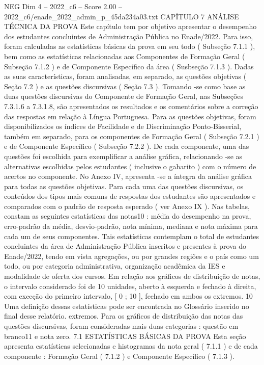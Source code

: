 \begin{textsample}{NEG Dim 4 – 2022\_c6 – Score 2.00 – 2022\_c6/enade\_2022\_admin\_p\_45da234a03.txt}  \label{ex:f4_neg_275}
CAPÍTULO 7 ANÁLISE TÉCNICA DA PROVA Este capítulo tem por objetivo apresentar o desempenho dos estudantes concluintes de Administração Pública no Enade/2022.
Para isso, foram calculadas as estatísticas básicas da prova em seu todo ( Subseção 7.1.1 ), bem como as estatísticas relacionadas aos Componentes de Formação Geral ( Subseção 7.1.2 ) e de Componente Específico da área ( Susbseção 7.1.3 ).
Dadas as suas características, foram analisadas, em separado, as questões objetivas ( Seção 7.2 ) e as questões discursivas ( Seção 7.3 ).
Tomando -se como base as duas questões discursivas do Componente de Formação Geral, nas Subseções 7.3.1.6 a 7.3.1.8, são apresentados os resultados e os comentários sobre a correção das respostas em relação à Língua Portuguesa.
Para as questões objetivas, foram disponibilizados os índices de Facilidade e de Discriminação Ponto-Bisserial, também em separado, para os componentes de Formação Geral ( Subseção 7.2.1 ) e de Componente Específico ( Subseção 7.2.2 ).
De cada componente, uma das questões foi escolhida para exemplificar a análise gráfica, relacionando -se as alternativas escolhidas pelos estudantes ( inclusive o gabarito ) com o número de acertos no componente.
No Anexo IV, apresenta -se a íntegra da análise gráfica para todas as questões objetivas.
Para cada uma das questões discursivas, os conteúdos dos tipos mais comuns de respostas dos estudantes são apresentados e comparados com o padrão de resposta esperado ( ver Anexo IX ).
Nas tabelas, constam as seguintes estatísticas das notas10 : média do desempenho na prova, erro-padrão da média, desvio-padrão, nota mínima, mediana e nota máxima para cada um de seus componentes.
Tais estatísticas contemplam o total de estudantes concluintes da área de Administração Pública inscritos e presentes à prova do Enade/2022, tendo em vista agregações, ou por grandes regiões e o país como um todo, ou por categoria administrativa, organização acadêmica da IES e modalidade de oferta dos cursos.
Em relação aos gráficos de distribuição de notas, o intervalo considerado foi de 10 unidades, aberto à esquerda e fechado à direita, com exceção do primeiro intervalo, [ 0 ; 10 ], fechado em ambos os extremos. 10 Uma definição dessas estatísticas pode ser encontrada no Glossário inserido no final desse relatório. extremos.
Para os gráficos de distribuição das notas das questões discursivas, foram consideradas mais duas categorias : questão em branco11 e nota zero. 7.1 ESTATÍSTICAS BÁSICAS DA PROVA Esta seção apresenta estatísticas selecionadas e histogramas da nota geral ( 7.1.1 ) e de cada componente : Formação Geral ( 7.1.2 ) e Componente Específico ( 7.1.3 ).

\end{textsample}

